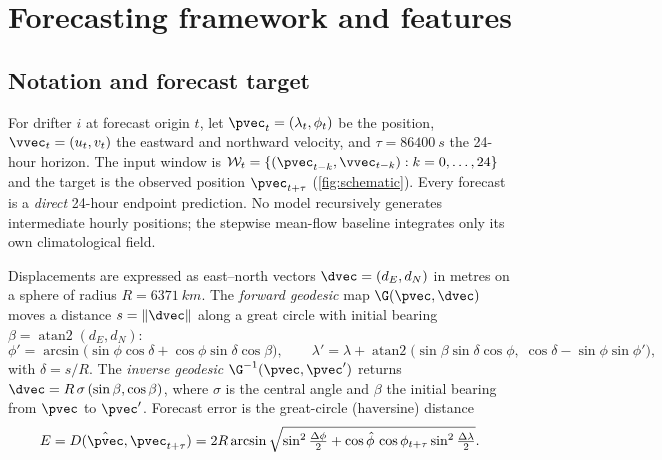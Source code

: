 \section{Forecasting framework and features}\label{sec:framework}

\subsection{Notation and forecast target}
For drifter $i$ at forecast origin $t$, let $\pvec_t=(\lambda_t,\phi_t)$ be the position, $\vvec_t=(u_t,v_t)$ the eastward and northward velocity, and $\tau=\SI{86400}{s}$ the 24-hour horizon. The input window is $\mathcal{W}_t=\{(\pvec_{t-k},\vvec_{t-k}):k=0,\dots,24\}$ and the target is the observed position $\pvec_{t+\tau}$ (\cref{fig:schematic}). Every forecast is a \emph{direct} 24-hour endpoint prediction. No model recursively generates intermediate hourly positions; the stepwise mean-flow baseline integrates only its own climatological field.

Displacements are expressed as east--north vectors $\dvec=(d_E,d_N)$ in metres on a sphere of radius $R=\SI{6371}{km}$. The \emph{forward geodesic} map $\G(\pvec,\dvec)$ moves a distance $s=\lVert\dvec\rVert$ along a great circle with initial bearing $\beta=\operatorname{atan2}(d_E,d_N)$:
\begin{equation}\label{eq:forward}
\phi'=\arcsin\!\big(\sin\phi\cos\delta+\cos\phi\sin\delta\cos\beta\big),\qquad
\lambda'=\lambda+\operatorname{atan2}\!\big(\sin\beta\sin\delta\cos\phi,\;\cos\delta-\sin\phi\sin\phi'\big),
\end{equation}
with $\delta=s/R$. The \emph{inverse geodesic} $\G^{-1}(\pvec,\pvec')$ returns $\dvec=R\,\sigma\,(\sin\beta,\cos\beta)$, where $\sigma$ is the central angle and $\beta$ the initial bearing from $\pvec$ to $\pvec'$. Forecast error is the great-circle (haversine) distance
\begin{equation}\label{eq:error}
E=D(\hat\pvec,\pvec_{t+\tau})=2R\arcsin\sqrt{\sin^2\tfrac{\Delta\phi}{2}+\cos\hat\phi\,\cos\phi_{t+\tau}\sin^2\tfrac{\Delta\lambda}{2}}.
\end{equation}

